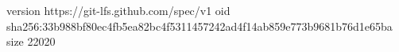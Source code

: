 version https://git-lfs.github.com/spec/v1
oid sha256:33b988bf80ec4fb5ea82bc4f5311457242ad4f14ab859e773b9681b76d1e65ba
size 22020
